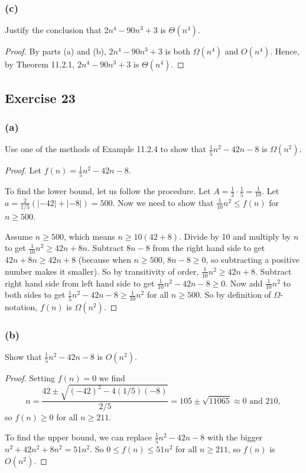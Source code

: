 \documentclass[14pt]{extarticle}
\newcommand{\dps}{\displaystyle}
\begin{document}
\subsubsection{(c)}
Justify the conclusion that \(2n^4 - 90n^3 + 3\) is \(\Theta(n^4)\).

\begin{proof}
By parts (a) and (b), \(2n^4 - 90n^3 + 3\) is both \(\Omega(n^4)\) and \(O(n^4)\). Hence, by Theorem 11.2.1, 
\(2n^4 - 90n^3 + 3\) is \(\Theta(n^4)\).
\end{proof}

\subsection{Exercise 23}
\subsubsection{(a)}
Use one of the methods of Example 11.2.4 to show that \(\frac{1}{5}n^2 - 42n - 8\) is \(\Omega(n^2)\).

\begin{proof}
Let \(\dps f(n) = \frac{1}{5}n^2 - 42n - 8\). 

To find the lower bound, let us follow the procedure. Let \(\dps A = \frac{1}{2} \cdot \frac{1}{5} = \frac{1}{10}\). 
Let \(\dps a = \frac{2}{1/5}(|-42| + |-8|) = 500\). Now we need to show that \(\dps \frac{1}{10}n^2 \leq f(n)\) for 
\(n \geq 500\).

Assume \(n \geq 500\), which means \(n \geq 10(42+8)\). Divide by 10 and multiply by \(n\) to get \(\dps \frac{1}{10}n^2 \geq 
42n + 8n\). Subtract \(8n-8\) from the right hand side to get \(42n + 8n \geq 42n + 8\) (because when \(n \geq 500\), 
\(8n - 8 \geq 0\), so subtracting a positive number makes it smaller). So by transitivity of order, \(\dps \frac{1}{10}n^2 
\geq 42n + 8\). Subtract right hand side from left hand side to get \(\dps \frac{1}{10}n^2 - 42n - 8 \geq 0\). Now add 
\(\dps \frac{1}{10}n^2\) to both sides to get \(\dps \frac{1}{5}n^2- 42n - 8 \geq \frac{1}{10}n^2\) for all \(n \geq 500\). 
So by definition of \(\Omega\)-notation, \(f(n)\) is \(\Omega(n^2)\).
\end{proof}

\subsubsection{(b)}
Show that \(\frac{1}{5}n^2 - 42n - 8\) is \(O(n^2)\).
\begin{proof}
Setting \(f(n) = 0\) we find 
\[
n = \frac{42 \pm \sqrt{(-42)^2-4(1/5)(-8)}}{2/5} = 105 \pm \sqrt{11065} \approx 0 \text{ and } 210,
\] 
so \(f(n) \geq 0\) for all \(n \geq 211\).

To find the upper bound, we can replace \(\frac{1}{5}n^2 - 42n - 8\) with the bigger \(n^2 + 42n^2 + 8n^2 = 51n^2\). So 
\(0 \leq f(n) \leq 51n^2\) for all \(n \geq 211\), so \(f(n)\) is \(O(n^2)\).
\end{proof}
\end{document}
